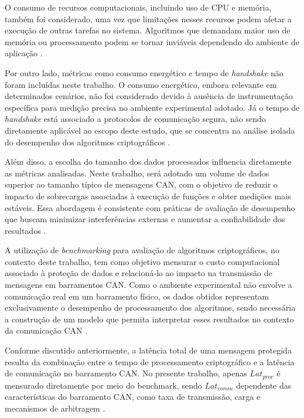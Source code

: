 O consumo de recursos computacionais, incluindo uso de CPU e memória, também foi considerado, uma vez que limitações nesses recursos podem afetar a execução de outras tarefas no sistema. Algoritmos que demandam maior uso de memória ou processamento podem se tornar inviáveis dependendo do ambiente de aplicação \cite{sass2010embedded}.

Por outro lado, métricas como consumo energético e tempo de \textit{handshake} não foram incluídas neste trabalho. O consumo energético, embora relevante em determinados cenários, não foi considerado devido à ausência de instrumentação específica para medição precisa no ambiente experimental adotado. Já o tempo de \textit{handshake} está associado a protocolos de comunicação segura, não sendo diretamente aplicável ao escopo deste estudo, que se concentra na análise isolada do desempenho dos algoritmos criptográficos \cite{rescorla2001ssl}.

Além disso, a escolha do tamanho dos dados processados influencia diretamente as métricas analisadas. Neste trabalho, será adotado um volume de dados superior ao tamanho típico de mensagens CAN, com o objetivo de reduzir o impacto de sobrecargas associadas à execução de funções e obter medições mais estáveis. Essa abordagem é consistente com práticas de avaliação de desempenho que buscam minimizar interferências externas e aumentar a confiabilidade dos resultados \cite{mytkowicz2009producing}.

A utilização de \textit{benchmarking} para avaliação de algoritmos criptográficos, no contexto deste trabalho, tem como objetivo mensurar o custo computacional associado à proteção de dados e relacioná-lo ao impacto na transmissão de mensagens em barramentos CAN. Como o ambiente experimental não envolve a comunicação real em um barramento físico, os dados obtidos representam exclusivamente o desempenho de processamento dos algoritmos, sendo necessária a construção de um modelo que permita interpretar esses resultados no contexto da comunicação CAN \cite{jain2010art,hennessy2011computer}.

Conforme discutido anteriormente, a latência total de uma mensagem protegida resulta da combinação entre o tempo de processamento criptográfico e a latência de comunicação no barramento CAN. No presente trabalho, apenas $Lat_{proc}$ é mensurado diretamente por meio do benchmark, sendo $Lat_{comm}$ dependente das características do barramento CAN, como taxa de transmissão, carga e mecanismos de arbitragem \cite{specification1991bosch}.

